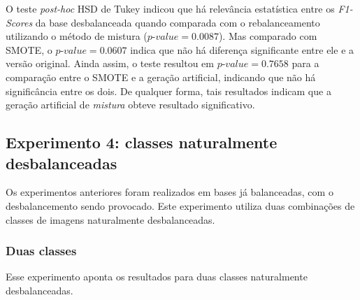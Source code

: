 
O teste \textit{post-hoc} HSD de Tukey indicou que há relevância estatística entre os \textit{F1-Scores} da base desbalanceada quando comparada com o rebalanceamento utilizando o método de mistura ($ \textit{p-value} = 0.0087$). Mas comparado com SMOTE, o $\textit{p-value} = 0.0607$ indica que não há diferença significante entre ele e a versão original. Ainda assim, o teste resultou em $\textit{p-value} = 0.7658$ para a comparação entre o SMOTE e a geração artificial, indicando que não há significância entre os dois. De qualquer forma, tais resultados indicam que a geração artificial de \emph{mistura} obteve resultado significativo.

\FloatBarrier
\subsection{Experimento 4: classes naturalmente desbalanceadas}

Os experimentos anteriores foram realizados em bases já balanceadas, com o desbalancemento sendo provocado. Este experimento utiliza duas combinações de classes de imagens naturalmente desbalanceadas.


\subsubsection{Duas classes}

Esse experimento aponta os resultados para duas classes naturalmente desbalanceadas.


